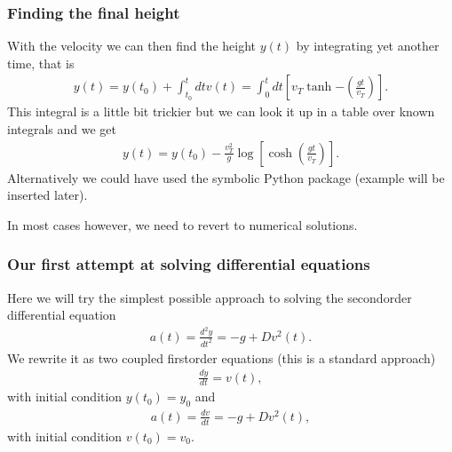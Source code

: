 \documentclass[letterpaper,10pt,english]{sphinxmanual}
\begin{document}
\subsubsection{Finding the final height}
\label{\detokenize{chapter2:finding-the-final-height}}
With the velocity we can then find the height \(y(t)\) by integrating yet another time, that is
\begin{equation*}
\begin{split}
y(t)=y(t_0)+\int_{t_0}^t dt v(t)=\int_{0}^t dt[v_T\tanh{-(\frac{gt}{v_T})}].
\end{split}
\end{equation*}
This integral is a little bit trickier but we can look it up in a table over
known integrals and we get
\begin{equation*}
\begin{split}
y(t)=y(t_0)-\frac{v_T^2}{g}\log{[\cosh{(\frac{gt}{v_T})}]}.
\end{split}
\end{equation*}
Alternatively we could have used the symbolic Python package   (example will be inserted later).

In most cases however, we need to revert to numerical solutions.


\subsubsection{Our first attempt at solving differential equations}
\label{\detokenize{chapter2:our-first-attempt-at-solving-differential-equations}}
Here we will try the simplest possible approach to solving the second\sphinxhyphen{}order differential
equation
\begin{equation*}
\begin{split}
a(t) =\frac{d^2y}{dt^2}= -g +Dv^2(t).
\end{split}
\end{equation*}
We rewrite it as two coupled first\sphinxhyphen{}order equations (this is a standard approach)
\begin{equation*}
\begin{split}
\frac{dy}{dt} = v(t),
\end{split}
\end{equation*}
with initial condition \(y(t_0)=y_0\) and
\begin{equation*}
\begin{split}
a(t) =\frac{dv}{dt}= -g +Dv^2(t),
\end{split}
\end{equation*}
with initial condition \(v(t_0)=v_0\).
\end{document}
